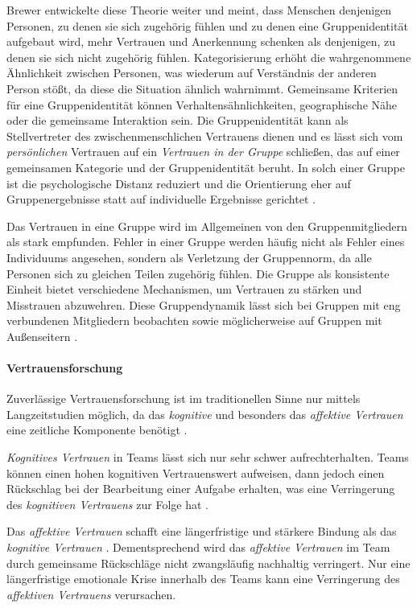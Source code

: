 \documentclass[a4paper,11pt]{article}%
\renewcommand{\\}{\vspace*{0.5\baselineskip} \newline}
\begin{document}
{Brewer \citep{brewer1981} entwickelte diese Theorie weiter und meint, dass Menschen denjenigen Personen, zu denen sie sich zugehörig fühlen und zu denen eine Gruppenidentität aufgebaut wird, mehr Vertrauen und Anerkennung schenken als denjenigen, zu denen sie sich nicht zugehörig fühlen. Kategorisierung erhöht die wahrgenommene Ähnlichkeit zwischen Personen, was wiederum auf Verständnis der anderen Person stößt, da diese die Situation ähnlich wahrnimmt.
Gemeinsame Kriterien für eine Gruppenidentität können Verhaltensähnlichkeiten, geographische Nähe oder die gemeinsame Interaktion sein. Die Gruppenidentität kann als Stellvertreter des zwischenmenschlichen Vertrauens dienen und es lässt sich vom \textit{persönlichen} Vertrauen auf ein \textit{Vertrauen in der Gruppe} schließen, das auf einer gemeinsamen Kategorie und der Gruppenidentität beruht.
In solch einer Gruppe ist die psychologische Distanz reduziert und die Orientierung eher auf Gruppenergebnisse statt auf individuelle Ergebnisse gerichtet \citep[355-360]{brewer1981}.

Das Vertrauen in eine Gruppe wird im Allgemeinen von den Gruppenmitgliedern als stark empfunden. Fehler in einer Gruppe werden häufig nicht als Fehler eines Individuums angesehen, sondern als Verletzung der Gruppennorm, da alle Personen sich zu gleichen Teilen zugehörig fühlen. Die Gruppe als konsistente Einheit bietet verschiedene Mechanismen, um Vertrauen zu stärken und Misstrauen abzuwehren. Diese Gruppendynamik lässt sich bei Gruppen mit eng verbundenen Mitgliedern beobachten sowie möglicherweise auf Gruppen mit Außenseitern \citep[397-403]{stolle2002trusting}.

\paragraph{Vertrauensforschung}
\label{Vertrauensforschung}
Zuverlässige Vertrauensforschung ist im traditionellen Sinne nur mittels Langzeitstudien möglich, da das \textit{kognitive} und besonders das \textit{affektive Vertrauen} eine zeitliche Komponente benötigt \citep{jones1998experience}.

\textit{Kognitives Vertrauen} in Teams lässt sich nur sehr schwer aufrechterhalten. Teams können einen hohen kognitiven Vertrauenswert aufweisen, dann jedoch einen Rückschlag bei der Bearbeitung einer Aufgabe erhalten, was eine Verringerung des \textit{kognitiven Vertrauens} zur Folge hat \citep[S. 29-31]{mcallister1995affect}.

Das \textit{affektive Vertrauen} schafft eine längerfristige und stärkere Bindung als das \textit{kognitive Vertrauen} \citep[S. 29-31]{mcallister1995affect}.
Dementsprechend wird das \textit{affektive Vertrauen} im Team durch gemeinsame Rückschläge nicht zwangsläufig nachhaltig verringert. Nur eine längerfristige emotionale Krise innerhalb des Teams kann eine Verringerung des \textit{affektiven Vertrauens} verursachen. 

}
\end{document}
